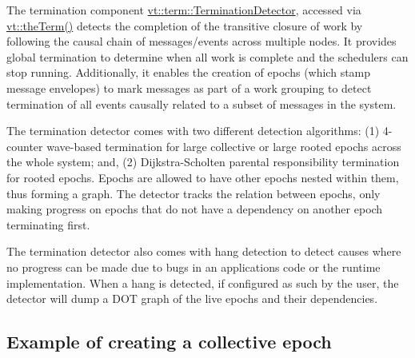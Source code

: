 The termination component {\ttfamily \hyperlink{structvt_1_1term_1_1_termination_detector}{vt\+::term\+::\+Termination\+Detector}}, accessed via {\ttfamily \hyperlink{namespacevt_a127580fdfcaba0b4171e5c48c5676733}{vt\+::the\+Term()}} detects the completion of the transitive closure of work by following the causal chain of messages/events across multiple nodes. It provides global termination to determine when all work is complete and the schedulers can stop running. Additionally, it enables the creation of epochs (which stamp message envelopes) to mark messages as part of a work grouping to detect termination of all events causally related to a subset of messages in the system.

The termination detector comes with two different detection algorithms\+: (1) 4-\/counter wave-\/based termination for large collective or large rooted epochs across the whole system; and, (2) Dijkstra-\/\+Scholten parental responsibility termination for rooted epochs. Epochs are allowed to have other epochs nested within them, thus forming a graph. The detector tracks the relation between epochs, only making progress on epochs that do not have a dependency on another epoch terminating first.

The termination detector also comes with hang detection to detect causes where no progress can be made due to bugs in an application\textquotesingle{}s code or the runtime implementation. When a hang is detected, if configured as such by the user, the detector will dump a D\+OT graph of the live epochs and their dependencies.\hypertarget{term_term-collective-example}{}\subsection{Example of creating a collective epoch}\label{term_term-collective-example}

